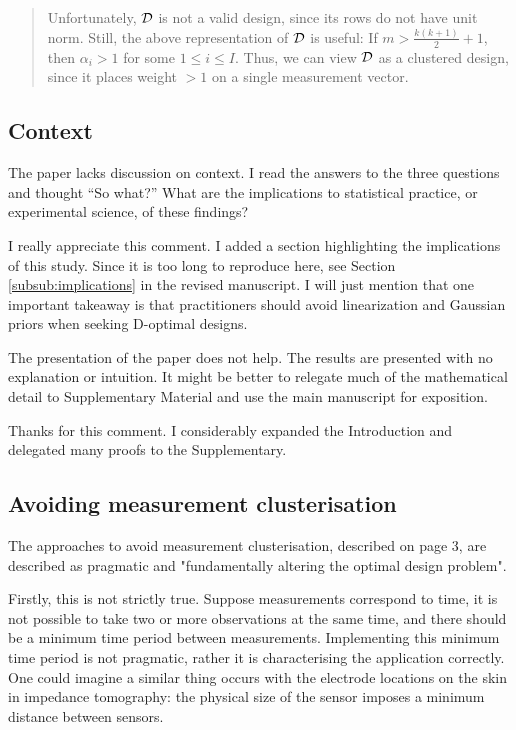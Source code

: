 \begin{quote}
  Unfortunately, $\mathcal{D}$ is not a valid design, since its rows do not
  have unit norm. Still, the above representation of $\mathcal{D}$ is useful:
  If $m > \frac{k(k+1)}{2} + 1$, then $\alpha_i > 1$ for some $1\leq i
  \leq I$.  Thus, we can view $\mathcal{D}$ as a clustered design, since it
  places weight $>1$ on a single measurement vector.
\end{quote}


\subsection{Context}
\RC The paper lacks discussion on context. I read the answers to the
three questions and thought “So what?”  What are the implications to
statistical practice, or experimental science, of these findings?

\AR I really appreciate this comment. I added a section highlighting
the implications of this study. Since it is too long to reproduce
here, see Section \ref{subsub:implications} in the revised
manuscript. I will just mention that one important takeaway is that
practitioners should avoid linearization and Gaussian priors when
seeking D-optimal designs.


\RC The presentation of the paper does not help. The results are
presented with no explanation or intuition. It might be better to
relegate much of the mathematical detail to Supplementary Material and
use the main manuscript for exposition.

\AR Thanks for this comment. I considerably expanded the
  Introduction and delegated many proofs to the Supplementary.


\subsection{Avoiding measurement clusterisation}
\RC The approaches to avoid measurement clusterisation, described on page
3, are described as pragmatic and "fundamentally altering the optimal
design problem".

\RC Firstly, this is not strictly true. Suppose measurements correspond to
time, it is not possible to take two or more observations at the same
time, and there should be a minimum time period between measurements.
Implementing this minimum time period is not pragmatic, rather it is
characterising the application correctly. One could imagine a similar
thing occurs with the electrode locations on the skin in impedance
tomography: the physical size of the sensor imposes a minimum
distance between sensors.


